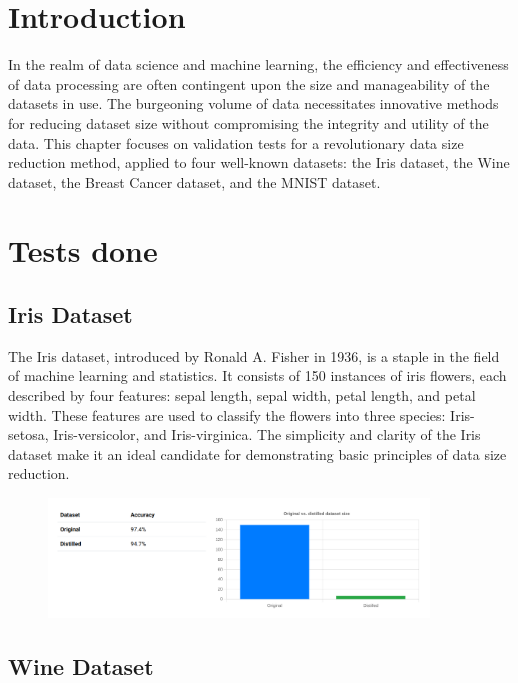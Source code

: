 \section{Introduction}

In the realm of data science and machine learning, the efficiency and effectiveness of data processing are often contingent upon the size and manageability of the datasets in use. The burgeoning volume of data necessitates innovative methods for reducing dataset size without compromising the integrity and utility of the data. This chapter focuses on validation tests for a revolutionary data size reduction method, applied to four well-known datasets: the Iris dataset, the Wine dataset, the Breast Cancer dataset, and the MNIST dataset.

\section{Tests done}
\subsection{Iris Dataset}

The Iris dataset, introduced by Ronald A. Fisher in 1936, is a staple in the field of machine learning and statistics. It consists of 150 instances of iris flowers, each described by four features: sepal length, sepal width, petal length, and petal width. These features are used to classify the flowers into three species: Iris-setosa, Iris-versicolor, and Iris-virginica. The simplicity and clarity of the Iris dataset make it an ideal candidate for demonstrating basic principles of data size reduction.

\begin{figure}[h]
\includegraphics[width=0.9\textwidth]{images/Iris_validation_test.png}
\centering
\caption{}
\end{figure}

\subsection{Wine Dataset}

